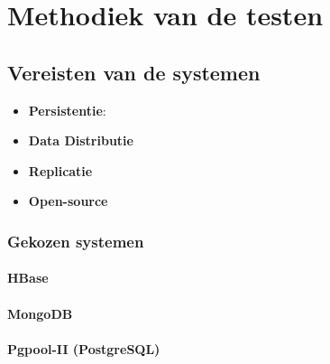 \chapter{Methodiek van de testen}	



\section{Vereisten van de systemen}

\begin{itemize}
\item \textbf{Persistentie}: 
\item \textbf{Data Distributie}
\item \textbf{Replicatie}
\item \textbf{Open-source}
\end{itemize}

\subsection{Gekozen systemen}
\subsubsection{HBase}
\subsubsection{MongoDB}
\subsubsection{Pgpool-II (PostgreSQL)}